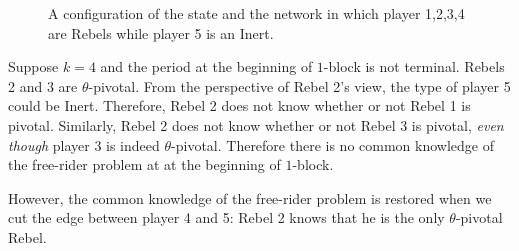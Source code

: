 \documentclass[12pt,letter]{article}
\newtheorem{conjecture}{Conjecture}[section]
\theoremstyle{definition}
\theoremstyle{remark}
\theoremstyle{claim}
\begin{document}
\begin{figure}[!h]
\label{fig:cyclic_network}
\begin{center}
\end{center}
\caption{A configuration of the state and the network in which player 1,2,3,4 are Rebels while player 5 is an Inert.}
\end{figure}

Suppose $k=4$ and the period at the beginning of $1$-block is not terminal. Rebels 2 and 3 are $\theta$-pivotal. From the perspective of Rebel 2's view, the type of player 5 could be Inert. Therefore, Rebel 2 does not know whether or not Rebel 1 is pivotal. Similarly, Rebel 2 does not know whether or not Rebel 3 is pivotal, \textit{even though} player 3 is indeed $\theta$-pivotal. Therefore there is no common knowledge of the free-rider problem at at the beginning of $1$-block.  

However, the common knowledge of the free-rider problem is restored when we cut the edge between player 4 and 5: Rebel 2 knows that he is the only $\theta$-pivotal Rebel.


%
%
%
%
\end{document}

